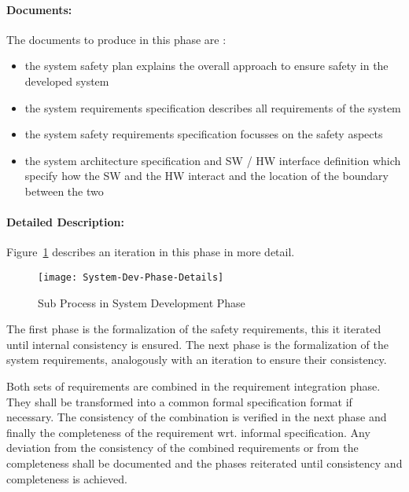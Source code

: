 \paragraph{Documents:}
\label{sec:sys-dev-documents}
The documents to produce in this phase are :
\begin{itemize}
\item the system safety plan explains the overall
approach to ensure safety in the developed system
\item the system requirements
specification describes all requirements of the system
\item the system safety requirements
specification focusses on the safety aspects
\item the system architecture specification
and SW / HW interface definition which specify how the SW and the HW interact
and the location of the boundary between the two
\end{itemize} 

\paragraph{Detailed Description:}
\label{sec:sys-dev-deta-descr}
Figure~\ref{fig:detailed-sys-dev-phase} describes an iteration in this phase in
more detail.

\begin{figure}[ht]
  \centering
  \texttt{[image: System-Dev-Phase-Details]}
  \caption{Sub Process in System Development Phase}
  \label{fig:detailed-sys-dev-phase}
\end{figure}

The first phase is the formalization of the safety requirements, this it
iterated until internal consistency is ensured. The next phase is the
formalization of the system requirements, analogously with an iteration to
ensure their consistency.

Both sets of requirements are combined in the requirement integration
phase. They shall be transformed into a common formal specification format if
necessary. The consistency of the combination is verified in the next phase and
finally the completeness of the requirement wrt. informal specification. Any
deviation from the consistency of the combined requirements or from the
completeness shall be documented and the phases reiterated until consistency and
completeness is achieved.


\begin{comment} Some requirements to take into account :
\end{comment}

